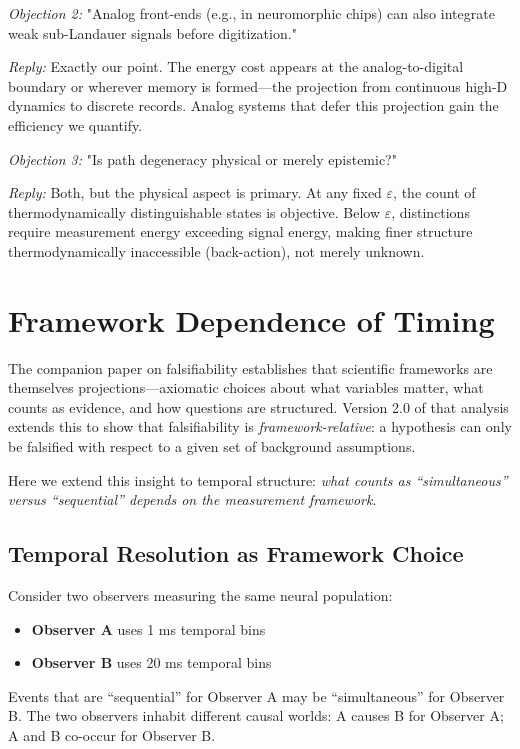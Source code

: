 \documentclass[12pt]{article}
\numberwithin{equation}{section}
\begin{document}
\emph{Objection 2:} "Analog front-ends (e.g., in neuromorphic chips) can also integrate weak sub-Landauer signals before digitization."

\emph{Reply:} Exactly our point. The energy cost appears at the analog-to-digital boundary or wherever memory is formed—the projection from continuous high-D dynamics to discrete records. Analog systems that defer this projection gain the efficiency we quantify.

\emph{Objection 3:} "Is path degeneracy physical or merely epistemic?"

\emph{Reply:} Both, but the physical aspect is primary. At any fixed $\varepsilon$, the count of thermodynamically distinguishable states is objective. Below $\varepsilon$, distinctions require measurement energy exceeding signal energy, making finer structure thermodynamically inaccessible (back-action), not merely unknown.

\section{Framework Dependence of Timing}

The companion paper on falsifiability \cite{todd2025biosystems} establishes that scientific frameworks are themselves projections---axiomatic choices about what variables matter, what counts as evidence, and how questions are structured. Version 2.0 of that analysis extends this to show that falsifiability is \emph{framework-relative}: a hypothesis can only be falsified with respect to a given set of background assumptions.

Here we extend this insight to temporal structure: \emph{what counts as ``simultaneous'' versus ``sequential'' depends on the measurement framework}.

\subsection{Temporal Resolution as Framework Choice}

Consider two observers measuring the same neural population:
\begin{itemize}
\item \textbf{Observer A} uses 1 ms temporal bins
\item \textbf{Observer B} uses 20 ms temporal bins
\end{itemize}

Events that are ``sequential'' for Observer A may be ``simultaneous'' for Observer B. The two observers inhabit different causal worlds: A causes B for Observer A; A and B co-occur for Observer B.
\end{document}
